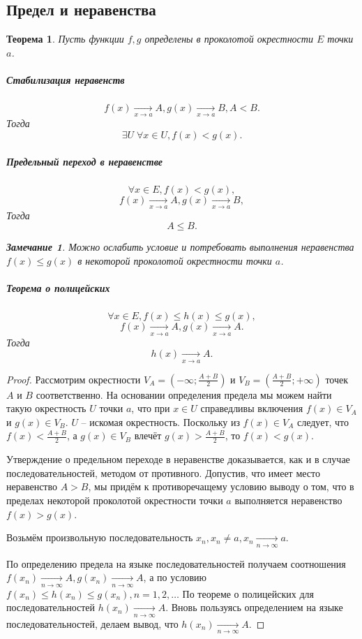 \documentclass{article}
\newtheorem{Theorem}{Теорема}[section]
\newtheorem{Remark}{Замечание}[section]
\begin{document}
\subsection{Предел и неравенства}
\begin{Theorem}
Пусть функции $f, g$ определены в проколотой окрестности $E$ точки $a$.

\subparagraph{Стабилизация неравенств}
$$f(x) \xrightarrow[x \rightarrow a]{} A, g(x) \xrightarrow[x \rightarrow a]{} B, A < B.$$
Тогда
$$\exists U \; \forall x \in U, f(x) < g(x).$$

\subparagraph{Предельный переход в неравенстве}
$$\forall x \in E, f(x) < g(x),$$
$$f(x) \xrightarrow[x \rightarrow a]{} A, g(x) \xrightarrow[x \rightarrow a]{} B,$$
Тогда
$$A \leq B.$$
\begin{Remark}
Можно ослабить условие и потребовать выполнения неравенства $f(x) \leq g(x)$ в некоторой проколотой окрестности точки $a$.
\end{Remark}

\subparagraph{Теорема о полицейских}
$$\forall x \in E, f(x) \leq h(x) \leq g(x),$$
$$f(x) \xrightarrow[x \rightarrow a]{} A, g(x) \xrightarrow[x \rightarrow a]{} A.$$
Тогда
$$h(x) \xrightarrow[x \rightarrow a]{} A.$$

\end{Theorem}
\begin{proof}
Рассмотрим окрестности $V_A = \left( -\infty;\frac{A+B}{2} \right)$ и $V_B = \left(\frac{A+B}{2};+\infty \right)$ точек $A$ и $B$ соответственно. На основании определения предела мы можем найти такую окрестность $U$ точки $a$, что при $x \in U$ справедливы включения $f(x) \in V_A$ и $g(x) \in V_B$. $U$ -- искомая окрестность. Поскольку из $f(x) \in V_A$ следует, что $f(x) < \frac{A+B}{2}$, а $g(x) \in V_B$ влечёт $g(x) > \frac{A+B}{2}$, то $f(x) < g(x)$.

Утверждение о предельном переходе в неравенстве доказывается, как и в случае последовательностей, методом от противного. Допустив, что имеет место неравенство $A > B$, мы придём к противоречащему условию выводу о том, что в пределах некоторой проколотой окрестности точки $a$ выполняется неравенство $f(x) > g(x)$.

Возьмём произвольную последовательность ${x_n}, x_n \neq a, x_n \xrightarrow[n \rightarrow \infty]{} a.$

По определению предела на языке последовательностей получаем соотношения $f(x_n) \xrightarrow[n \rightarrow \infty]{} A, g(x_n) \xrightarrow[n \rightarrow \infty]{} A$, а по условию $f(x_n) \leq h(x_n) \leq g(x_n), n = 1, 2, \ldots$ По теореме о полицейских для последовательностей $h(x_n) \xrightarrow[n \rightarrow \infty]{} A$. Вновь пользуясь определением на языке последовательностей, делаем вывод, что $h(x_n) \xrightarrow[n \rightarrow \infty]{} A$.
\end{proof}
\end{document}
